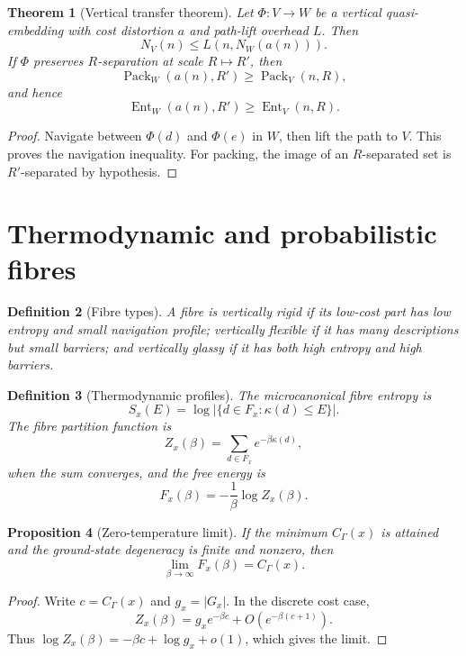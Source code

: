\documentclass[11pt]{article}
\newtheorem{theorem}{Theorem}[section]
\newtheorem{proposition}[theorem]{Proposition}
\newtheorem{definition}[theorem]{Definition}
\DeclareMathOperator{\Ent}{Ent}
\DeclareMathOperator{\Pack}{Pack}
\begin{document}
\begin{theorem}[Vertical transfer theorem]
Let \(\Phi:V\to W\) be a vertical quasi-embedding with cost distortion \(a\) and path-lift overhead \(L\).  Then
\[
N_V(n)\le L(n,N_W(a(n))).
\]
If \(\Phi\) preserves \(R\)-separation at scale \(R\mapsto R'\), then
\[
\Pack_W(a(n),R')\ge \Pack_V(n,R),
\]
and hence
\[
\Ent_W(a(n),R')\ge \Ent_V(n,R).
\]
\end{theorem}

\begin{proof}
Navigate between \(\Phi(d)\) and \(\Phi(e)\) in \(W\), then lift the path to \(V\).  This proves the navigation inequality.  For packing, the image of an \(R\)-separated set is \(R'\)-separated by hypothesis.
\end{proof}

\section{Thermodynamic and probabilistic fibres}

\begin{definition}[Fibre types]
A fibre is vertically rigid if its low-cost part has low entropy and small navigation profile; vertically flexible if it has many descriptions but small barriers; and vertically glassy if it has both high entropy and high barriers.
\end{definition}

\begin{definition}[Thermodynamic profiles]
The microcanonical fibre entropy is
\[
S_x(E)=\log|\{d\in F_x:\kappa(d)\le E\}|.
\]
The fibre partition function is
\[
Z_x(\beta)=\sum_{d\in F_x}e^{-\beta\kappa(d)},
\]
when the sum converges, and the free energy is
\[
F_x(\beta)=-\frac1\beta\log Z_x(\beta).
\]
\end{definition}

\begin{proposition}[Zero-temperature limit]
If the minimum \(C_\Gamma(x)\) is attained and the ground-state degeneracy is finite and nonzero, then
\[
\lim_{\beta\to\infty}F_x(\beta)=C_\Gamma(x).
\]
\end{proposition}

\begin{proof}
Write \(c=C_\Gamma(x)\) and \(g_x=|G_x|\).  In the discrete cost case,
\[
Z_x(\beta)=g_xe^{-\beta c}+O(e^{-\beta(c+1)}).
\]
Thus \(\log Z_x(\beta)=-\beta c+\log g_x+o(1)\), which gives the limit.
\end{proof}
\end{document}
